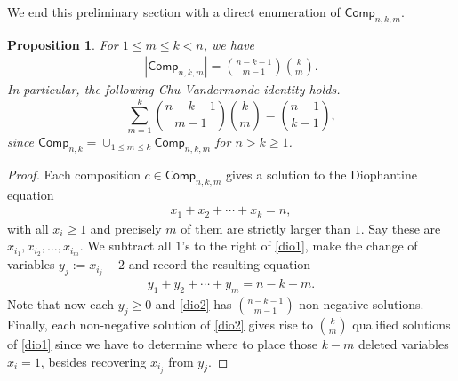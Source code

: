 \documentclass[reqno]{amsart}
\numberwithin{equation}{section}
\newtheorem{proposition}[theorem]{Proposition}
\theoremstyle{definition}
\theoremstyle{named}
\def\Comp{\mathsf{Comp}}
\begin{document}
We end this preliminary section with a direct enumeration of $\Comp_{n,k,m}$.
\begin{proposition}\label{prop:comp}
For $1\le m\le k <n$, we have
\begin{align}\label{id:Compnkm}
|\Comp_{n,k,m}|=\binom{n-k-1}{m-1}\binom{k}{m}.
\end{align}
In particular, the following Chu-Vandermonde identity holds. 
$$\sum_{m=1}^k\binom{n-k-1}{m-1}\binom{k}{m}=\binom{n-1}{k-1},$$
since $\Comp_{n,k}=\cup_{1\le m\le k}\Comp_{n,k,m}$ for $n>k\ge 1$.
\end{proposition}
\begin{proof}
Each composition $c\in\Comp_{n,k,m}$ gives a solution to the Diophantine equation
\begin{align}\label{dio1}
x_1+x_2+\cdots+x_k=n,
\end{align}
with all $x_i\ge 1$ and precisely $m$ of them are strictly larger than $1$. Say these are $x_{i_1},x_{i_2},\ldots,x_{i_m}$. We subtract all $1$'s to the right of \eqref{dio1}, make the change of variables $y_j:=x_{i_j}-2$ and record the resulting equation
\begin{align}\label{dio2}
y_1+y_2+\cdots+y_m=n-k-m.
\end{align}
Note that now each $y_j\ge 0$ and \eqref{dio2} has $\binom{n-k-1}{m-1}$ non-negative solutions. Finally, each non-negative solution of \eqref{dio2} gives rise to $\binom{k}{m}$ qualified solutions of \eqref{dio1} since we have to determine where to place those $k-m$ deleted variables $x_i=1$, besides recovering $x_{i_j}$ from $y_j$.
\end{proof}
\end{document}
